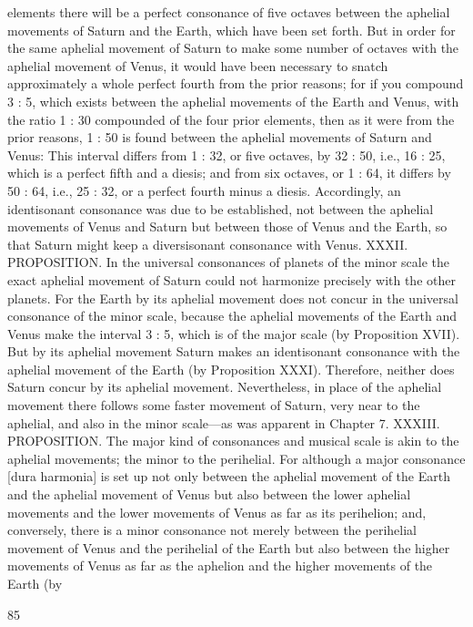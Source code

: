 \documentclass{article}
\begin{document}
elements there will be a perfect consonance of five octaves between the
aphelial movements of Saturn and the Earth, which have been set forth.
But in order for the same aphelial movement of Saturn to make some
number of octaves with the aphelial movement of Venus, it would have
been necessary to snatch approximately a whole perfect fourth from the
prior reasons; for if you compound 3 : 5, which exists between the
aphelial movements of the Earth and Venus, with the ratio 1 : 30
compounded of the four prior elements, then as it were from the prior
reasons, 1 : 50 is found between the aphelial movements of Saturn and
Venus: This interval differs from 1 : 32, or five octaves, by 32 : 50, i.e., 16
: 25, which is a perfect fifth and a diesis; and from six octaves, or 1 : 64, it
differs by 50 : 64, i.e., 25 : 32, or a perfect fourth minus a diesis.
Accordingly, an identisonant consonance was due to be established, not
between the aphelial movements of Venus and Saturn but between those
of Venus and the Earth, so that Saturn might keep a diversisonant
consonance with Venus. XXXII. PROPOSITION. In the universal
consonances of planets of the minor scale the exact aphelial movement
of Saturn could not harmonize precisely with the other planets.
For the Earth by its aphelial movement does not concur in the universal
consonance of the minor scale, because the aphelial movements of the
Earth and Venus make the interval 3 : 5, which is of the major scale (by
Proposition XVII). But by its aphelial movement Saturn makes an
identisonant consonance with the aphelial movement of the Earth (by
Proposition XXXI). Therefore, neither does Saturn concur by its aphelial
movement. Nevertheless, in place of the aphelial movement there follows
some faster movement of Saturn, very near to the aphelial, and also in
the minor scale—as was apparent in Chapter 7.
XXXIII. PROPOSITION. The major kind of consonances and musical
scale is akin to the aphelial movements; the minor to the perihelial.
For although a major consonance [dura harmonia] is set up not only
between the aphelial movement of the Earth and the aphelial movement
of Venus but also between the lower aphelial movements and the lower
movements of Venus as far as its perihelion; and, conversely, there is a
minor consonance not merely between the perihelial movement of Venus
and the perihelial of the Earth but also between the higher movements of
Venus as far as the aphelion and the higher movements of the Earth (by


85
\end{document}
